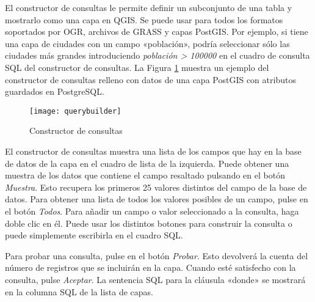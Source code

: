 El constructor de consultas le permite definir un subconjunto de una tabla y mostrarlo como una capa en QGIS. Se puede usar para todos los formatos soportados por OGR, archivos de GRASS y capas PostGIS. Por ejemplo, si tiene una capa de ciudades con un campo «población», podría seleccionar sólo las ciudades más grandes introduciendo \textsl{población > 100000} en el cuadro de consulta SQL del constructor de consultas. La Figura \ref{fig:query_builder} muestra un ejemplo del constructor de consultas relleno con datos de una capa PostGIS con atributos guardados en PostgreSQL.

\begin{figure}[ht]
  \begin{center}
    \caption{Constructor de consultas}\label{fig:query_builder}\smallskip
    \texttt{[image: querybuilder]}
  \end{center}
\end{figure}

El constructor de consultas muestra una lista de los campos que hay en la base de datos de la capa en el cuadro de lista de la izquierda. Puede obtener una muestra de los datos que contiene el campo resaltado pulsando en el botón \textit{Muestra}. Esto recupera los primeros 25 valores distintos del campo de la base de datos. Para obtener una lista de todos los valores posibles de un campo, pulse en el botón \textit{Todos}. Para añadir un campo o valor seleccionado a la consulta, haga doble clic en él. Puede usar los distintos botones para construir la consulta o puede simplemente escribirla en el cuadro SQL.

Para probar una consulta, pulse en el botón \textit{Probar}. Esto devolverá la cuenta del número de registros que se incluirán en la capa. Cuando esté satisfecho con la consulta, pulse \textit{Aceptar}. La sentencia SQL para la cláusula «donde» se mostrará en la columna SQL de la lista de capas.

\begin{Tip}\caption{\textsc{Cambiar la definición de la capa}} 
\end{Tip}

